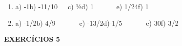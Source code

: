 \documentclass[12pt]{article}
\renewcommand{\_}{\kern-1.5pt\textunderscore\kern-1.5pt}
\begin{document}
\vspace{\baselineskip}
\setlength{\parskip}{9.96pt}
\begin{enumerate}
	\item a) -1\tab b) -11/10\ \ \  \tab c) ½\tab  d) 1 \ \ \ \ \ \  e) 1/24\tab f) 1\par


\vspace{\baselineskip}
\setlength{\parskip}{8.04pt}
\setlength{\parskip}{9.96pt}
	\item a) -1/2\tab b) 4/9\ \ \ \ \ \ \  c) -13/2\tab d)-1/5\ \ \ \ \ \ \  e) 30\tab f) 3/2
\end{enumerate}\par


\vspace{\baselineskip}
\setlength{\parskip}{8.04pt}
\begin{adjustwidth}{0.3in}{0.0in}
\textbf{EXERCÍCIOS 5}\par

\end{adjustwidth}
\end{document}
